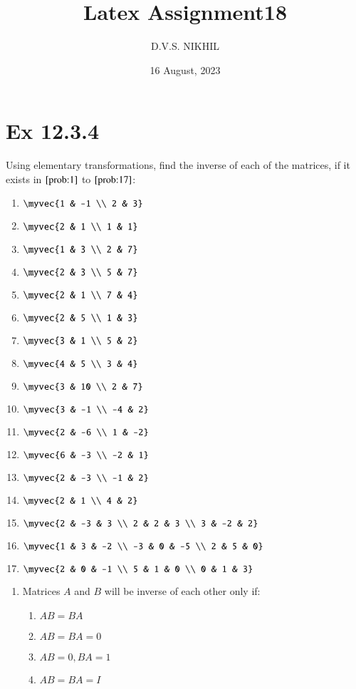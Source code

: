 \documentclass{article}
\theoremstyle{remark}
\begin{document}
\title{Latex Assignment18}
\author{D.V.S. NIKHIL}
\date{16 August, 2023}
\maketitle
\section*{Ex 12.3.4}
Using elementary transformations, find the inverse of each of the matrices, if it exists in $\ref{prob:1}$ to $\ref{prob:17}$:
\begin{enumerate}
\item $\myvec
{1 & -1 \\ 2 & 3}$ \label{prob:1}
\item $\myvec
{2 & 1 \\ 1 & 1}$
\item $\myvec
{1 & 3 \\ 2 & 7}$
\item $\myvec
{2 & 3 \\ 5 & 7}$
\item $\myvec
{2 & 1 \\ 7 & 4}$
\item $\myvec
{2 & 5 \\ 1 & 3}$
\item $\myvec
{3 & 1 \\ 5 & 2}$
\item $\myvec
{4 & 5 \\ 3 & 4}$
\item $\myvec
{3 & 10 \\ 2 & 7}$
\item $\myvec
{3 & -1 \\ -4 & 2}$
\item $\myvec
{2 & -6 \\ 1 & -2}$
\item $\myvec
{6 & -3 \\ -2 & 1}$
\item $\myvec
{2 & -3 \\ -1 & 2}$
\item $\myvec
{2 & 1 \\ 4 & 2}$
\item $\myvec 
{2 & -3 & 3 \\ 2 & 2 & 3 \\ 3 & -2 & 2}$
\item $\myvec
{1 & 3 & -2 \\ -3 & 0 & -5 \\ 2 & 5 & 0}$  
\item $\myvec
{2 & 0 & -1 \\ 5 & 1 & 0 \\ 0 & 1 & 3}$ \label{prob:17}
\end{enumerate}
\begin{enumerate}[resume]
\item Matrices $A$ and $B$ will be inverse of each other only if:
\begin{enumerate}
\item $AB=BA$
\item $AB=BA=0$
\item $AB=0, BA=1$
\item $AB=BA=I$
\end{enumerate}
\end{enumerate}
\end{document}
